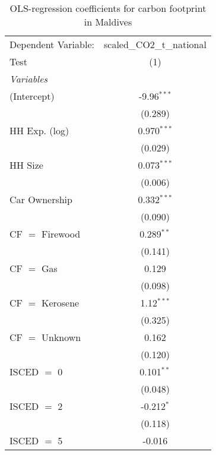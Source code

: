 
\begin{table}[htbp!]
   \centering
   \small
   \begin{adjustbox}{width = 1\textwidth, max height = 0.95\textheight, center}
      \begin{threeparttable}[b]
         \caption{\label{tab:OLS_2_MDV} OLS-regression coefficients for carbon footprint in Maldives}
         \begin{tabular}{lc}
            \tabularnewline \midrule \midrule
            Dependent Variable: & scaled\_CO2\_t\_national\\     
            Test                & (1)\\  
            \midrule
            \emph{Variables}\\
            (Intercept)         & -9.96$^{***}$\\   
                                & (0.289)\\   
            HH Exp. (log)       & 0.970$^{***}$\\   
                                & (0.029)\\   
            HH Size             & 0.073$^{***}$\\   
                                & (0.006)\\   
            Car Ownership       & 0.332$^{***}$\\   
                                & (0.090)\\   
            CF $=$ Firewood     & 0.289$^{**}$\\   
                                & (0.141)\\   
            CF $=$ Gas          & 0.129\\   
                                & (0.098)\\   
            CF $=$ Kerosene     & 1.12$^{***}$\\   
                                & (0.325)\\   
            CF $=$ Unknown      & 0.162\\   
                                & (0.120)\\   
            ISCED $=$ 0         & 0.101$^{**}$\\   
                                & (0.048)\\   
            ISCED $=$ 2         & -0.212$^{*}$\\   
                                & (0.118)\\   
            ISCED $=$ 5         & -0.016\\   

\end{tabular}
\end{threeparttable}
\end{adjustbox}
\end{table}
